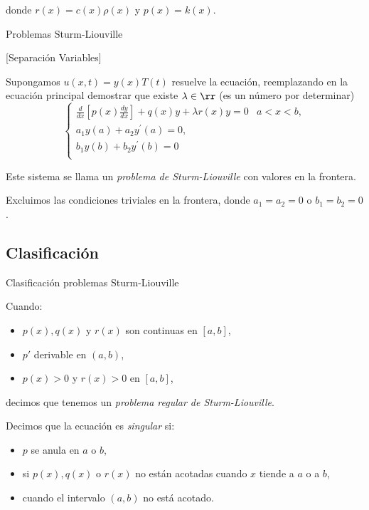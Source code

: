donde $r(x)=c(x) \rho(x)$ y $p(x)=k(x)$.

   
 


{Problemas Sturm-Liouville}

\begin{ejercicio}{}[Separación Variables]
 
Supongamos $u(x, t)=y(x) T(t)$ resuelve la ecuación,  reemplazando en la ecuación principal demostrar  que existe $\lambda\in\rr$ (es un número por determinar)
\[
 \left\{
        \begin{array}{ll}
        \frac{d}{d x}\left[p(x) \frac{d y}{d x}\right]+q(x) y+\lambda r(x) y=0 & a<x<b,\\
        a_{1} y(a)+a_{2} y^{\prime}(a)=0, &\\
        b_{1} y(b)+b_{2} y^{\prime}(b)=0 & \\
        \end{array}
 \right.
 \]
\end{ejercicio}

Este sistema se llama  un \emph{problema de Sturm-Liouville} con valores en la frontera. 

Excluimos las condiciones triviales en la frontera, donde $a_{1}=a_{2}=0$ o $b_{1}=b_{2}=0$. 



 
 

\subsection{Clasificación}
{Clasificación problemas Sturm-Liouville}
\begin{definicion}
 Cuando:
 \begin{itemize}
  \item  $p(x), q(x)$ y $r(x)$ son continuas en $[a, b]$, 
  \item $p'$ derivable en $(a,b)$,
  \item $p(x)>0$ y $r(x)>0$ en $[a, b]$, 
 \end{itemize}
decimos que tenemos un  \emph{ problema regular de Sturm-Liouville}.


Decimos que la ecuación es \emph{singular} si:
 \begin{itemize}
  \item $p$ se anula en $a$ o  $ b$,
  \item si $p(x), q(x)$ o $r(x)$ no están acotadas cuando $x$ tiende a $a$ o a $b$,
  \item cuando el intervalo $(a, b)$ no está acotado. 
 \end{itemize}



  
\end{definicion}


